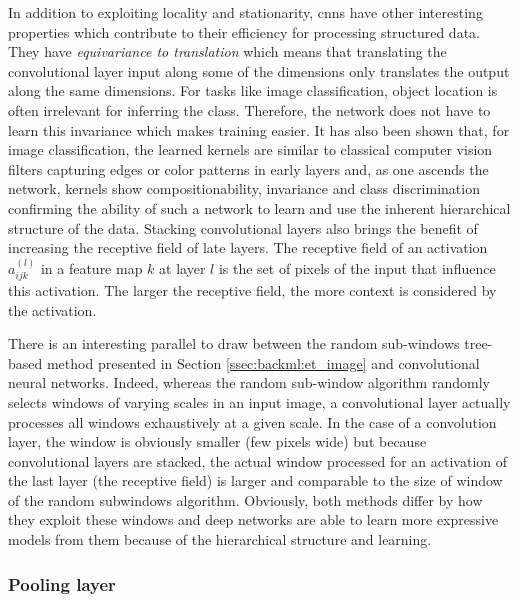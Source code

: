 In addition to exploiting locality and stationarity, \acrshort{cnn}s have other
interesting properties which contribute to their efficiency for processing structured
data. They have \textit{equivariance to translation} which means that translating
the convolutional layer input along some of the dimensions only translates the
output along the same dimensions. For tasks like image classification, object
location is often irrelevant for inferring the class. Therefore, the network does
not have to learn this invariance which makes training easier. It has also been
shown that, for image classification, the learned kernels are similar to classical
computer vision filters capturing edges or color patterns in early layers and, as
one ascends the network, kernels show compositionability, invariance and class
discrimination \cite{zeiler2014visualizing} confirming the ability of such
a network to learn and use the inherent hierarchical structure of the data. Stacking
convolutional layers also brings the benefit of increasing the receptive field of
late layers. The receptive field of an activation $a^{(l)}_{ijk}$ in a feature
map $k$ at layer $l$ is the set of pixels of the input that influence this
activation. The larger the receptive field, the more context is considered by the
activation.

There is an interesting parallel to draw between the random sub-windows tree-based method presented in Section \ref{ssec:backml:et_image} and convolutional neural networks. Indeed, whereas the random sub-window algorithm randomly selects windows of varying scales in an input image, a convolutional layer actually processes all windows exhaustively at a given scale. In the case of a convolution layer, the window is obviously smaller (\ie few pixels wide) but because convolutional layers are stacked, the actual window processed for an activation of the last layer (\ie the receptive field) is larger and comparable to the size of window of the random subwindows algorithm. Obviously, both methods differ by how they exploit these windows and deep networks are able to learn more expressive models from them because of the hierarchical structure and learning. 

\subsubsection{Pooling layer}
\label{sssec:backml:poolinglayer}

